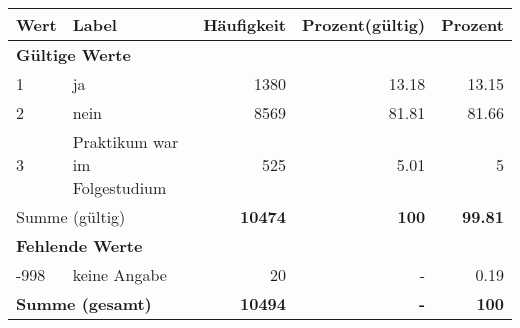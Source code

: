      \begin{longtable}{lXrrr}
     \toprule
     \textbf{Wert} & \textbf{Label} & \textbf{Häufigkeit} & \textbf{Prozent(gültig)} & \textbf{Prozent} \\
     \endhead
     \midrule
     \multicolumn{5}{l}{\textbf{Gültige Werte}}\\

     1 &
     \multicolumn{1}{X}{ ja   } &


       \num{1380} &
       \num[round-mode=places,round-precision=2]{13.18} &
         \num[round-mode=places,round-precision=2]{13.15} \\

     2 &
     \multicolumn{1}{X}{ nein   } &


       \num{8569} &
       \num[round-mode=places,round-precision=2]{81.81} &
         \num[round-mode=places,round-precision=2]{81.66} \\

     3 &
     \multicolumn{1}{X}{ Praktikum war im Folgestudium   } &


       \num{525} &
       \num[round-mode=places,round-precision=2]{5.01} &
         \num[round-mode=places,round-precision=2]{5} \\
     \midrule
     \multicolumn{2}{l}{Summe (gültig)} &
       \textbf{\num{10474}} &
     \textbf{\num{100}} &
       \textbf{\num[round-mode=places,round-precision=2]{99.81}} \\
     \multicolumn{5}{l}{\textbf{Fehlende Werte}}\\
       -998 &
       keine Angabe &
         \num{20} &
        - &
         \num[round-mode=places,round-precision=2]{0.19} \\
     \midrule
     \multicolumn{2}{l}{\textbf{Summe (gesamt)}} &
          \textbf{\num{10494}} &
        \textbf{-} &
        \textbf{\num{100}} \\
     \bottomrule
     \end{longtable}
     
